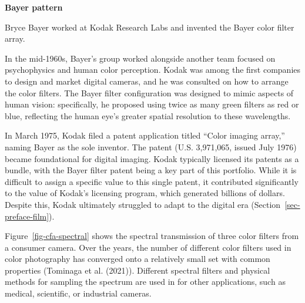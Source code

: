 \documentclass[
  letterpaper,
]{book}
\begin{document}
\begin{tcolorbox}[enhanced jigsaw, colframe=quarto-callout-note-color-frame, rightrule=.15mm, breakable, left=2mm, colback=white, leftrule=.75mm, arc=.35mm, opacityback=0, toprule=.15mm, bottomrule=.15mm]
\begin{minipage}[t]{5.5mm}
\textcolor{quarto-callout-note-color}{\faInfo}
\end{minipage}%
\begin{minipage}[t]{\textwidth - 5.5mm}

\vspace{-3mm}\textbf{Bayer pattern}\vspace{3mm}

Bryce Bayer worked at Kodak Research Labs and invented the Bayer color
filter array.

In the mid-1960s, Bayer's group worked alongside another team focused on
psychophysics and human color perception. Kodak was among the first
companies to design and market digital cameras, and he was consulted on
how to arrange the color filters. The Bayer filter configuration was
designed to mimic aspects of human vision: specifically, he proposed
using twice as many green filters as red or blue, reflecting the human
eye's greater spatial resolution to these wavelengths.

In March 1975, Kodak filed a patent application titled ``Color imaging
array,'' naming Bayer as the sole inventor. The patent (U.S. 3,971,065,
issued July 1976) became foundational for digital imaging. Kodak
typically licensed its patents as a bundle, with the Bayer filter patent
being a key part of this portfolio. While it is difficult to assign a
specific value to this single patent, it contributed significantly to
the value of Kodak's licensing program, which generated billions of
dollars. Despite this, Kodak ultimately struggled to adapt to the
digital era (Section~\ref{sec-preface-film}).

\end{minipage}%
\end{tcolorbox}

Figure~\ref{fig-cfa-spectral} shows the spectral transmission of three
color filters from a consumer camera. Over the years, the number of
different color filters used in color photography has converged onto a
relatively small set with common properties (Tominaga et al. (2021)).
Different spectral filters and physical methods for sampling the
spectrum are used in for other applications, such as medical,
scientific, or industrial cameras.
\end{document}
